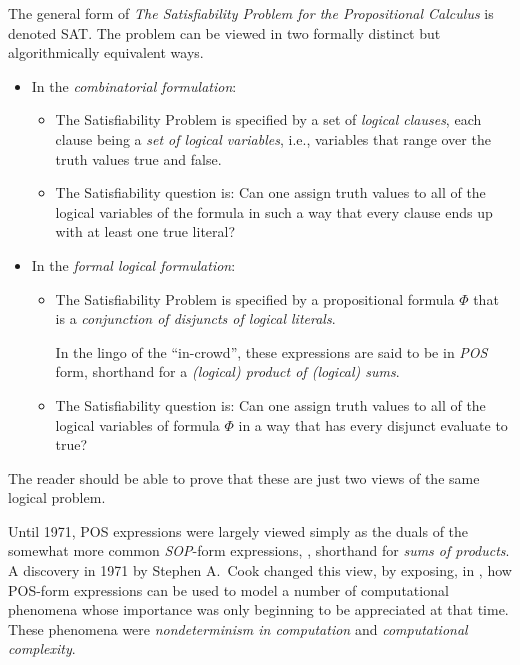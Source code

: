 
The general form of {\it The Satisfiability Problem for the
  Propositional Calculus} 
is denoted {\sf SAT}.  
The problem can be viewed in two formally distinct but algorithmically
equivalent ways.
\begin{itemize}
\item
In the {\it combinatorial formulation}:
  \begin{itemize}
  \item
The Satisfiability Problem is specified by a set of {\it logical
  clauses}, each clause being a {\it set of {\em logical} variables},
i.e., variables that range over the truth values {\sc true} and
{\sc false}.
  \item
The Satisfiability question is: Can one assign truth values to all of
the logical variables of the formula in such a way that every clause
ends up with at least one {\sc true} literal?
  \end{itemize}
\item
In the {\it formal logical formulation}:
  \begin{itemize}
  \item
The Satisfiability Problem is specified by a propositional formula
$\Phi$ that is  a {\it conjunction of disjuncts of logical literals}.

In the lingo of the ``in-crowd'', these expressions are said to be in
{\it POS} form,  shorthand for a {\it
  (logical) product of (logical) sums}.
  \item
The Satisfiability question is: Can one assign truth values to all of
the logical variables of formula $\Phi$ in a way that has every disjunct
evaluate to {\sc true}?
  \end{itemize}
\end{itemize}
The reader should be able to prove that these are just two views of
the same logical problem.

Until 1971, POS expressions were largely viewed simply as the duals of
the somewhat more common {\it SOP}-form expressions, 
, shorthand for {\it sums of products}.  A
discovery in 1971 by Stephen A.~Cook   changed
this view, by exposing, in \cite{Cook71}, how POS-form expressions can
be used to model a number of computational phenomena whose importance
was only beginning to be appreciated at that time.  These phenomena
were {\it nondeterminism in computation}
 and {\it computational complexity}.

